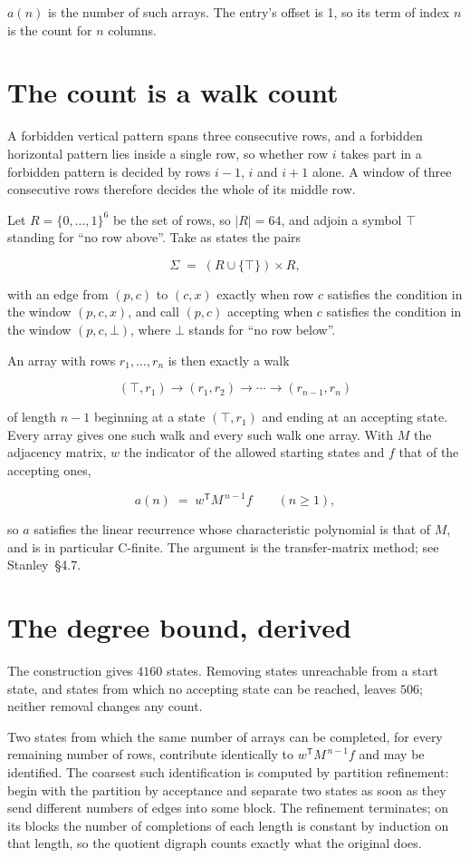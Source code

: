 \documentclass[11pt]{article}
\theoremstyle{definition}
\begin{document}
$a(n)$ is the number of such arrays. The entry's offset is 1, so its term of index $n$ is the count for $n$ columns.

\section{The count is a walk count}

A forbidden vertical pattern spans three consecutive rows, and a forbidden horizontal pattern lies inside a single row, so whether row $i$ takes part in a forbidden pattern is decided by rows $i-1$, $i$ and $i+1$ alone. A window of three consecutive rows therefore decides the whole of its middle row.

Let $R = \{0,\dots,1\}^{6}$ be the set of rows, so $|R| = 64$, and adjoin a symbol $\top$ standing for ``no row above''. Take as states the pairs

\[\Sigma \;=\; (R \cup \{\top\}) \times R,\]

with an edge from $(p,c)$ to $(c,x)$ exactly when row $c$ satisfies the condition in the window $(p,c,x)$, and call $(p,c)$ accepting when $c$ satisfies the condition in the window $(p,c,\bot)$, where $\bot$ stands for ``no row below''.

An array with rows $r_1,\dots,r_n$ is then exactly a walk

\[(\top,r_1) \to (r_1,r_2) \to \cdots \to (r_{n-1},r_n)\]

of length $n-1$ beginning at a state $(\top,r_1)$ and ending at an accepting state. Every array gives one such walk and every such walk one array. With $M$ the adjacency matrix, $w$ the indicator of the allowed starting states and $f$ that of the accepting ones,

\[a(n) \;=\; w^{\mathsf T} M^{\,n-1} f \qquad (n \ge 1),\]

so $a$ satisfies the linear recurrence whose characteristic polynomial is that of $M$, and is in particular C-finite. The argument is the transfer-matrix method; see Stanley~\S4.7.

\section{The degree bound, derived}

The construction gives $4160$ states. Removing states unreachable from a start state, and states from which no accepting state can be reached, leaves $506$; neither removal changes any count.

Two states from which the same number of arrays can be completed, for every remaining number of rows, contribute identically to $w^{\mathsf T}M^{\,n-1}f$ and may be identified. The coarsest such identification is computed by partition refinement: begin with the partition by acceptance and separate two states as soon as they send different numbers of edges into some block. The refinement terminates; on its blocks the number of completions of each length is constant by induction on that length, so the quotient digraph counts exactly what the original does.
\end{document}
